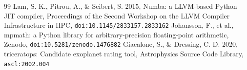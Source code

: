 \documentclass[11pt]{article}
\begin{document}
\begin{thebibliography}{99}
 Lam, S. K., Pitrou, A., \& Seibert, S. 2015, Numba: a LLVM-based Python JIT compiler, Proceedings of the Second Workshop on the LLVM Compiler Infrastructure in HPC, \texttt{doi:10.1145/2833157.2833162}
 Johansson, F., et al., mpmath: a Python library for arbitrary-precision floating-point arithmetic, Zenodo, \texttt{doi:10.5281/zenodo.1476882}
 Giacalone, S., \& Dressing, C. D. 2020, triceratops: Candidate exoplanet rating tool, Astrophysics Source Code Library, \texttt{ascl:2002.004}
\end{thebibliography}
\end{document}
